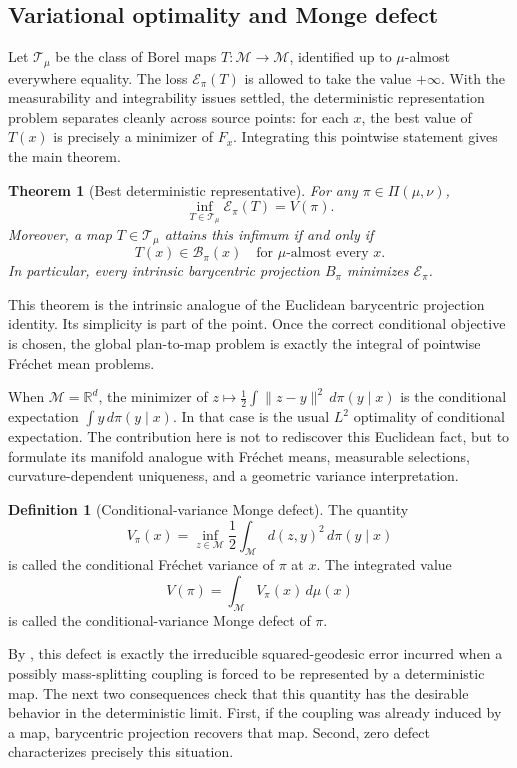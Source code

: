 \documentclass[10pt]{article} %
\newtheorem{theorem}{Theorem}
\theoremstyle{definition}
\newtheorem{definition}[definition]{Definition}
\providecommand{\R}{\mathbb{R}}
\providecommand{\1}{\mathbf{1}}
\providecommand{\sM}{\mathcal{M}}
\begin{document}
\subsection{Variational optimality and Monge defect}

Let $\mathcal T_\mu$ be the class of Borel maps $T:\sM\to\sM$, identified up to $\mu$-almost everywhere equality. The loss $\mathcal E_\pi(T)$ is allowed to take the value $+\infty$. With the measurability and integrability issues settled, the deterministic representation problem separates cleanly across source points: for each $x$, the best value of $T(x)$ is precisely a minimizer of $F_x$. Integrating this pointwise statement gives the main theorem.

\begin{theorem}[Best deterministic representative]
\label{thm:best_deterministic}
For any $\pi\in\Pi(\mu,\nu)$,
\[
\inf_{T\in\mathcal T_\mu}\mathcal E_\pi(T)=V(\pi).
\]
Moreover, a map $T\in\mathcal T_\mu$ attains this infimum if and only if
\[
T(x)\in\mathcal B_\pi(x)
\quad\text{for }\mu\text{-almost every }x.
\]
In particular, every intrinsic barycentric projection $B_\pi$ minimizes $\mathcal E_\pi$.
\end{theorem}


This theorem is the intrinsic analogue of the Euclidean barycentric projection identity. Its simplicity is part of the point. Once the correct conditional objective is chosen, the global plan-to-map problem is exactly the integral of pointwise Fr\'echet mean problems.


When $\sM=\R^d$, the minimizer of $z\mapsto \frac12\int\|z-y\|^2\,d\pi(y\mid x)$ is the conditional expectation $\int y\,d\pi(y\mid x)$. In that case  is the usual $L^2$ optimality of conditional expectation. The contribution here is not to rediscover this Euclidean fact, but to formulate its manifold analogue with Fr\'echet means, measurable selections, curvature-dependent uniqueness, and a geometric variance interpretation.


\begin{definition}[Conditional-variance Monge defect]
\label{def:monge_defect}
The quantity
\[
V_\pi(x)=\inf_{z\in\sM}\frac12\int_{\sM} d(z,y)^2\,d\pi(y\mid x)
\]
is called the {conditional Fr\'echet variance} of $\pi$ at $x$. The integrated value
\[
V(\pi)=\int_{\sM} V_\pi(x)\,d\mu(x)
\]
is called the {conditional-variance Monge defect} of $\pi$.
\end{definition}

By , this defect is exactly the irreducible squared-geodesic error incurred when a possibly mass-splitting coupling is forced to be represented by a deterministic map. The next two consequences check that this quantity has the desirable behavior in the deterministic limit. First, if the coupling was already induced by a map, barycentric projection recovers that map. Second, zero defect characterizes precisely this situation.
\end{document}
